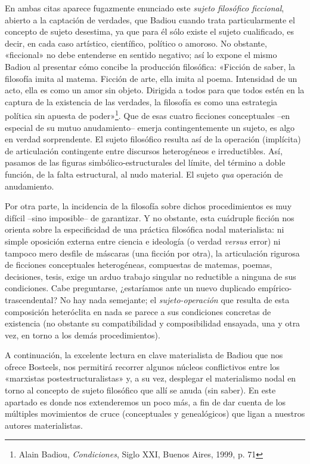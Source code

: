 En ambas citas aparece fugazmente enunciado este \emph{sujeto filosófico ficcional}, abierto a la captación de verdades, que Badiou cuando trata particularmente el concepto de sujeto desestima, ya que para él sólo existe el sujeto cualificado, es decir, en cada caso artístico, científico, político o amoroso. No obstante, «ficcional» no debe entenderse en sentido negativo; así lo expone el mismo Badiou al presentar cómo concibe la producción filosófica: «Ficción de saber, la filosofía imita al matema. Ficción de arte, ella imita al poema. Intensidad de un acto, ella es como un amor sin objeto. Dirigida a todos para que todos estén en la captura de la existencia de las verdades, la filosofía es como una estrategia política sin apuesta de poder»\footnote{Alain Badiou, \emph{Condiciones}, Siglo XXI, Buenos Aires, 1999, p. 71}. Que de esas cuatro ficciones conceptuales --en especial de su mutuo anudamiento-- emerja contingentemente un sujeto, es algo en verdad sorprendente. El sujeto filosófico resulta así de la operación (implícita) de articulación contingente entre discursos heterogéneos e irreductibles. Así, pasamos de las figuras simbólico-estructurales del límite, del término a doble función, de la falta estructural, al nudo material. El sujeto \emph{qua} operación de anudamiento.

Por otra parte, la incidencia de la filosofía sobre dichos procedimientos es muy difícil --sino imposible-- de garantizar. Y no obstante, esta cuádruple ficción nos orienta sobre la especificidad de una práctica filosófica nodal materialista: ni simple oposición externa entre ciencia e ideología (o verdad \emph{versus} error) ni tampoco mero desfile de máscaras (una ficción por otra), la articulación rigurosa de ficciones conceptuales heterogéneas, compuestas de matemas, poemas, decisiones, tesis, exige un arduo trabajo singular no reductible a ninguna de sus condiciones. Cabe preguntarse, ¿estaríamos ante un nuevo duplicado empírico-trascendental? No hay nada semejante; el \emph{sujeto-operación} que resulta de esta composición heteróclita en nada se parece a sus condiciones concretas de existencia (no obstante su compatibilidad y composibilidad ensayada, una y otra vez, en torno a los demás procedimientos).

A continuación, la excelente lectura en clave materialista de Badiou que nos ofrece Bosteels, nos permitirá recorrer algunos núcleos conflictivos entre los «marxistas postestructuralistas» y, a su vez, desplegar el materialismo nodal en torno al concepto de sujeto filosófico que allí se anuda (sin saber). En este apartado es donde nos extenderemos un poco más, a fin de dar cuenta de los múltiples movimientos de cruce (conceptuales y genealógicos) que ligan a nuestros autores materialistas.


